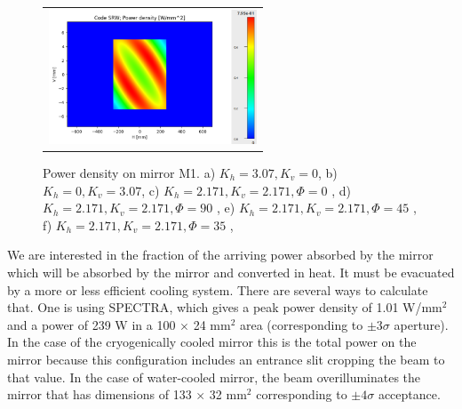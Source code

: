 \documentclass[]{spie}  %
\begin{document}
\begin{figure} [ht]
\begin{center}
\begin{tabular}{l}
      \includegraphics[height=4cm]{figures/powerdensityKhKv35.png}
\end{tabular}
\end{center}
\caption[example] 
{ \label{fig:M1powerdensity} 
Power density on mirror M1.
a) $K_h=3.07, K_v=0$,
b) $K_h=0,K_v=3.07$,
c) $K_h=2.171,K_v=2.171, \Phi=0$ \textdegree,
d) $K_h=2.171,K_v=2.171, \Phi=90$ \textdegree,
e) $K_h=2.171,K_v=2.171, \Phi=45$ \textdegree,
f) $K_h=2.171,K_v=2.171, \Phi=35$ \textdegree,
}
\end{figure} 


We are interested in the fraction of the arriving power absorbed by the mirror which will be absorbed by the mirror and converted in heat. It must be evacuated by a more or less efficient cooling system. There are several ways to calculate that. One is using SPECTRA\cite{codeSPECTRA}, which gives a peak power density of 1.01 W/mm$^2$ and a power of 239 W in a 100 $\times$ 24 mm$^2$ area (corresponding to $\pm 3 \sigma$ aperture). %
In the case of the cryogenically cooled mirror this is the total power on the mirror because this configuration includes an entrance slit cropping the beam to that value. In the case of water-cooled mirror, the beam overilluminates the mirror that has dimensions of 133 $\times$ 32 mm$^2$ corresponding to $\pm 4 \sigma$ acceptance.




\end{document}
